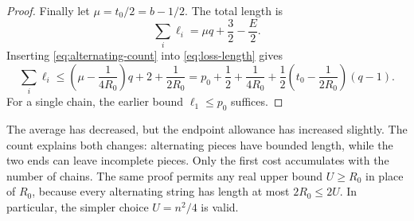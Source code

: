\begin{proof}
Finally let $\mu=t_0/2=b-1/2$. The total length is
\begin{equation}\label{eq:loss-length}
 \sum_i\ell_i=\mu q+\frac32-\frac E2.
\end{equation}
Inserting \eqref{eq:alternating-count} into \eqref{eq:loss-length}
gives
\[
 \sum_i\ell_i\le
 \left(\mu-\frac1{4R_0}\right)q+2+\frac1{2R_0}
 =p_0+\frac12+\frac1{4R_0}
  +\frac12\left(t_0-\frac1{2R_0}\right)(q-1).
\]
For a single chain, the earlier bound $\ell_1\le p_0$ suffices.
\end{proof}

The average has decreased, but the endpoint allowance has increased
slightly. The count explains both changes: alternating pieces have bounded
length, while the two ends can leave incomplete pieces. Only the first
cost accumulates with the number of chains.
The same proof permits any real upper bound $U\ge R_0$ in place of
$R_0$, because every alternating string has length at most $2R_0\le2U$.
In particular, the simpler choice $U=n^2/4$ is valid.
